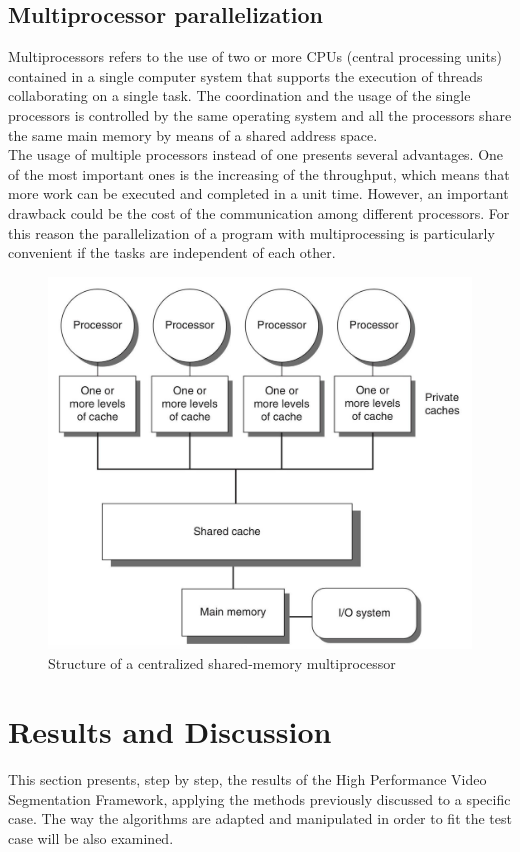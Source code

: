 \documentclass{usiinftr}
\begin{document}
\subsection{Multiprocessor parallelization}
Multiprocessors refers to the use of two or more CPUs (central processing units) contained in a single computer system that supports the execution of threads collaborating on a single task. The coordination and the usage of the single processors is controlled by the same operating system and all the processors share the same main memory by means of a shared address space.  \\
The usage of multiple processors instead of one presents several advantages. One of the most important ones is the increasing of the  throughput, which means that more work can be executed and completed in a unit time. However, an important drawback could be the cost of the communication among different processors. For this reason the parallelization of a program with multiprocessing is particularly convenient if the tasks are independent of each other.

\begin{figure}[h]
	\centering
	\includegraphics[width=0.5\linewidth]{img/multiprocessing}
	\caption{Structure of a centralized shared-memory multiprocessor \cite{13}}
	\label{fig:3}
\end{figure}



\section{Results and Discussion}
This section presents, step by step, the results of the High Performance Video Segmentation Framework, applying the methods previously discussed to a specific case. The way the algorithms are adapted and manipulated in order to fit the test case will be also examined. 
\end{document}
